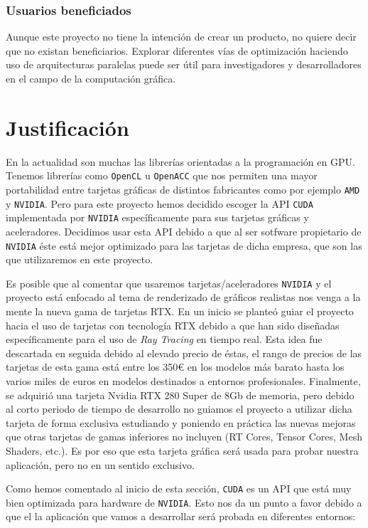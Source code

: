 \documentclass[twoside,a4paper,titlepage,11pt]{report}
\begin{document}
\subsubsection{Usuarios beneficiados}

Aunque este proyecto no tiene la intención de crear un producto, no quiere decir que no existan beneficiarios. Explorar diferentes vías de optimización haciendo uso de arquitecturas paralelas puede ser útil para investigadores y desarrolladores en el campo de la computación gráfica.

\section{Justificación}

En la actualidad son muchas las librerías orientadas a la programación en GPU. Tenemos librerías como \texttt{OpenCL} u \texttt{OpenACC} que nos permiten una mayor portabilidad entre tarjetas gráficas de distintos fabricantes como por ejemplo \texttt{AMD} y \texttt{NVIDIA}. Pero para este proyecto hemos decidido escoger la API \texttt{CUDA} implementada por \texttt{NVIDIA} específicamente para sus tarjetas gráficas y aceleradores. Decidimos usar esta API debido a que al ser sotfware propietario de \texttt{NVIDIA} éste está mejor optimizado para las tarjetas de dicha empresa, que son las que utilizaremos en este proyecto.

Es posible que al comentar que usaremos tarjetas/aceleradores \texttt{NVIDIA} y el proyecto está enfocado al tema de renderizado de gráficos realistas nos venga a la mente la nueva gama de tarjetas RTX. En un inicio se planteó guiar el proyecto hacia el uso de tarjetas con tecnología RTX debido a que han sido diseñadas específicamente para el uso de \textit{Ray Tracing} en tiempo real. Esta idea fue descartada en seguida debido al elevado precio de éstas, el rango de precios de las tarjetas de esta gama está entre los 350€ en los modelos más barato hasta los varios miles de euros en modelos destinados a entornos profesionales. Finalmente, se adquirió una tarjeta Nvidia RTX 280 Super de 8Gb de memoria, pero debido al corto periodo de tiempo de desarrollo no guiamos el proyecto a utilizar dicha tarjeta de forma exclusiva estudiando y poniendo en práctica las nuevas mejoras que otras tarjetas de gamas inferiores no incluyen (RT Cores, Tensor Cores, Mesh Shaders, etc.). Es por eso que esta tarjeta gráfica será usada para probar nuestra aplicación, pero no en un sentido exclusivo.

Como hemos comentado al inicio de esta sección, \texttt{CUDA} es un API que está muy bien optimizada para hardware de \texttt{NVIDIA}. Esto nos da un punto a favor debido a que el la aplicación que vamos a desarrollar será probada en diferentes entornos:
\end{document}
